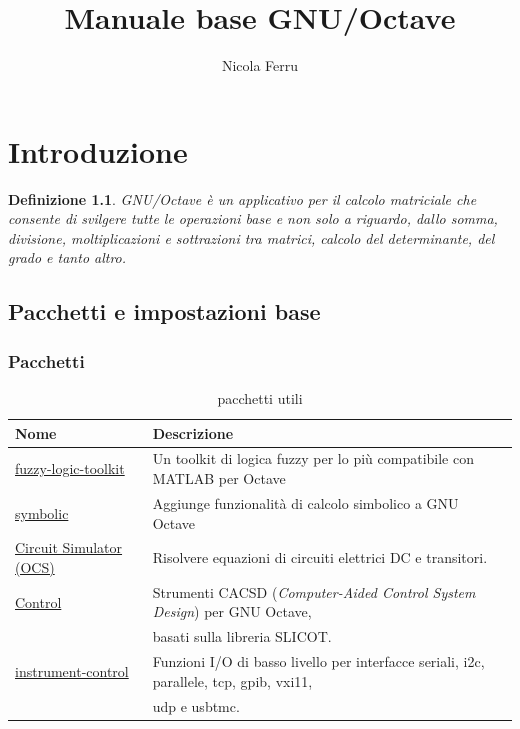 \documentclass{book}
\title{Manuale base GNU/Octave}
\author{Nicola Ferru}
\newtheorem{defi}{Definizione}[section]
\begin{document}
\maketitle
\tableofcontents
\chapter{Introduzione}
\label{chap:intro}
\begin{defi}
  GNU/Octave è un applicativo per il calcolo matriciale che consente di svilgere
  tutte le operazioni base e non solo a riguardo, dallo somma, divisione,
  moltiplicazioni e sottrazioni tra matrici, calcolo del determinante, del
  grado e tanto altro.
\end{defi}

\section{Pacchetti e impostazioni base}
\label{sec:packbase}

\subsection{Pacchetti}
\label{sec:pack}

\begin{table}[th]
  \centering
  \begin{tabular}{ll}
    {\bf Nome} & {\bf Descrizione}\\\hline
    \href{https://gnu-octave.github.io/packages/fuzzy-logic-toolkit/}{fuzzy-logic-toolkit} & Un toolkit di logica fuzzy per lo più
                                                                                               compatibile con MATLAB per Octave \\\hline
    \href{https://gnu-octave.github.io/packages/symbolic/}{symbolic} & Aggiunge funzionalità di calcolo simbolico a GNU
                        Octave \\\hline
    \href{https://gnu-octave.github.io/packages/ocs/}{Circuit Simulator (OCS)} & Risolvere equazioni di circuiti elettrici DC e transitori. \\\hline
    \href{https://gnu-octave.github.io/packages/control/}{Control} & Strumenti CACSD ({\it Computer-Aided Control System
                       Design}) per GNU Octave,\\ &basati sulla libreria SLICOT.\\\hline
    \href{https://gnu-octave.github.io/packages/instrument-control/}{instrument-control} & Funzioni I/O di basso livello per interfacce seriali, i2c, parallele, tcp, gpib, vxi11,\\
               &udp e usbtmc.\\\hline 
  \end{tabular}
  \caption{pacchetti utili}
  \label{tab:pachutil}
\end{table}
\end{document}
